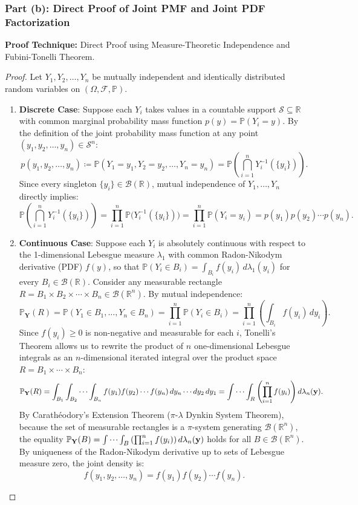 \documentclass[11pt, letterpaper]{article}
\theoremstyle{definition}
\theoremstyle{remark}
\newcommand{\R}{\mathbb{R}}
\newcommand{\Prob}{\mathbb{P}}
\newcommand{\F}{\mathcal{F}}
\begin{document}
\subsubsection*{Part (b): Direct Proof of Joint PMF and Joint PDF Factorization}
\textbf{Proof Technique:} Direct Proof using Measure-Theoretic Independence and Fubini-Tonelli Theorem.

\begin{proof}
Let $Y_1, Y_2, \dots, Y_n$ be mutually independent and identically distributed random variables on $(\Omega, \F, \Prob)$.
\begin{enumerate}[label=\textbf{Case \arabic*:}]
    \item \textbf{Discrete Case}: Suppose each $Y_i$ takes values in a countable support $\mathcal{S} \subseteq \R$ with common marginal probability mass function $p(y) = \Prob(Y_i = y)$. By the definition of the joint probability mass function at any point $(y_1, y_2, \dots, y_n) \in \mathcal{S}^n$:
    \[
        p(y_1, y_2, \dots, y_n) \coloneqq \Prob(Y_1 = y_1, Y_2 = y_2, \dots, Y_n = y_n) = \Prob\left(\bigcap_{i=1}^n Y_i^{-1}(\{y_i\})\right).
    \]
    Since every singleton $\{y_i\} \in \mathcal{B}(\R)$, mutual independence of $Y_1, \dots, Y_n$ directly implies:
    \[
        \Prob\left(\bigcap_{i=1}^n Y_i^{-1}(\{y_i\})\right) = \prod_{i=1}^n \Prob\big(Y_i^{-1}(\{y_i\})\big) = \prod_{i=1}^n \Prob(Y_i = y_i) = p(y_1)p(y_2)\cdots p(y_n).
    \]
    
    \item \textbf{Continuous Case}: Suppose each $Y_i$ is absolutely continuous with respect to the 1-dimensional Lebesgue measure $\lambda_1$ with common Radon-Nikodym derivative (PDF) $f(y)$, so that $\Prob(Y_i \in B_i) = \int_{B_i} f(y_i) \, d\lambda_1(y_i)$ for every $B_i \in \mathcal{B}(\R)$. Consider any measurable rectangle $R = B_1 \times B_2 \times \cdots \times B_n \in \mathcal{B}(\R^n)$. By mutual independence:
    \[
        \Prob_{\mathbf{Y}}(R) = \Prob(Y_1 \in B_1, \dots, Y_n \in B_n) = \prod_{i=1}^n \Prob(Y_i \in B_i) = \prod_{i=1}^n \left( \int_{B_i} f(y_i) \, dy_i \right).
    \]
    Since $f(y_i) \ge 0$ is non-negative and measurable for each $i$, Tonelli's Theorem allows us to rewrite the product of $n$ one-dimensional Lebesgue integrals as an $n$-dimensional iterated integral over the product space $R = B_1 \times \cdots \times B_n$:
    \[
        \Prob_{\mathbf{Y}}(R) = \int_{B_1} \int_{B_2} \cdots \int_{B_n} f(y_1)f(y_2)\cdots f(y_n) \, dy_n \cdots dy_2 \, dy_1 = \idotsint_R \left(\prod_{i=1}^n f(y_i)\right) d\lambda_n(\mathbf{y}).
    \]
    By Carathéodory's Extension Theorem ($\pi$-$\lambda$ Dynkin System Theorem), because the set of measurable rectangles is a $\pi$-system generating $\mathcal{B}(\R^n)$, the equality $\Prob_{\mathbf{Y}}(B) = \idotsint_B \left(\prod_{i=1}^n f(y_i)\right) d\lambda_n(\mathbf{y})$ holds for all $B \in \mathcal{B}(\R^n)$. By uniqueness of the Radon-Nikodym derivative up to sets of Lebesgue measure zero, the joint density is:
    \[
        f(y_1, y_2, \dots, y_n) = f(y_1)f(y_2)\cdots f(y_n).
    \]
\end{enumerate}
\end{proof}
\end{document}
